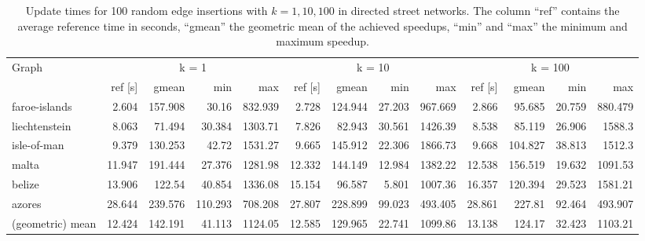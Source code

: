 \begin{landscape}
\begin{table}[h!]
\centering
\begin{tabular}{l|rrrr|rrrr|rrrr}
\toprule
Graph & \multicolumn{4}{c|}{k = 1} & \multicolumn{4}{c|}{k = 10} & \multicolumn{4}{c}{k = 100}\\
                &     ref [s] &   gmean &   min &     max &     ref [s] &   gmean &   min &     max &     ref [s] &   gmean &   min &     max \\
\midrule \midrule
 faroe-islands    &  2.604 & 157.908 &  30.16  &  832.939 &  2.728 & 124.944 & 27.203 &  967.669 &  2.866 &  95.685 & 20.759 &  880.479 \\
 liechtenstein    &  8.063 &  71.494 &  30.384 & 1303.71  &  7.826 &  82.943 & 30.561 & 1426.39  &  8.538 &  85.119 & 26.906 & 1588.3   \\
 isle-of-man      &  9.379 & 130.253 &  42.72  & 1531.27  &  9.665 & 145.912 & 22.306 & 1866.73  &  9.668 & 104.827 & 38.813 & 1512.3   \\
 malta            & 11.947 & 191.444 &  27.376 & 1281.98  & 12.332 & 144.149 & 12.984 & 1382.22  & 12.538 & 156.519 & 19.632 & 1091.53  \\
 belize           & 13.906 & 122.54  &  40.854 & 1336.08  & 15.154 &  96.587 &  5.801 & 1007.36  & 16.357 & 120.394 & 29.523 & 1581.21  \\
 azores           & 28.644 & 239.576 & 110.293 &  708.208 & 27.807 & 228.899 & 99.023 &  493.405 & 28.861 & 227.81  & 92.464 &  493.907 \\ \midrule \midrule
 (geometric) mean & 12.424 & 142.191 &  41.113 & 1124.05  & 12.585 & 129.965 & 22.741 & 1099.86  & 13.138 & 124.17  & 32.423 & 1103.21  \\
\bottomrule
\end{tabular}
\caption{Update times for 100 random edge insertions with $k = 1, 10, 100$ in directed street networks. The column ``ref'' contains the average reference time in seconds, ``gmean'' the geometric mean of the achieved speedups, ``min'' and ``max'' the minimum and maximum speedup.}
\label{tbl:resultsStreetNetworksDirected}
\end{table}

\end{landscape}




